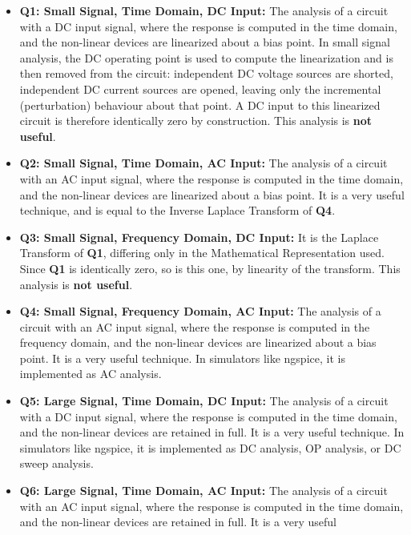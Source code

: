 \begin{itemize}
    \item \textbf{Q1: Small Signal, Time Domain, DC Input:}
      The analysis of a circuit with a DC input
      signal, where the response is computed in the time domain, and the
      non-linear devices are linearized about a bias point. In small
      signal analysis, the DC operating point is used to compute the
      linearization and is then removed from the circuit: independent DC
      voltage sources are shorted, independent DC current sources are
      opened, leaving only the incremental (perturbation) behaviour about
      that point. A DC input to this linearized circuit is therefore
      identically zero by construction. This analysis is \textbf{not useful}.
    \item \textbf{Q2: Small Signal, Time Domain, AC Input:}
      The analysis of a circuit with an AC input
      signal, where the response is computed in the time domain, and the
      non-linear devices are linearized about a bias point. It is a very
      useful technique, and is equal to the Inverse Laplace Transform of
      \textbf{Q4}.
    \item \textbf{Q3: Small Signal, Frequency Domain, DC Input:}
      It is the Laplace Transform of \textbf{Q1}, differing only in the Mathematical
      Representation used. Since \textbf{Q1} is identically zero, so is this one, by
      linearity of the transform. This analysis is \textbf{not useful}.
    \item \textbf{Q4: Small Signal, Frequency Domain, AC Input:}
      The analysis of a circuit with an AC
      input signal, where the response is computed in the frequency
      domain, and the non-linear devices are linearized about a bias
      point. It is a very useful technique. In simulators like ngspice, it
      is implemented as AC analysis.
    \item \textbf{Q5: Large Signal, Time Domain, DC Input:}
      The analysis of a circuit with a DC input
      signal, where the response is computed in the time domain, and the
      non-linear devices are retained in full. It is a very useful
      technique. In simulators like ngspice, it is implemented as DC
      analysis, OP analysis, or DC sweep analysis.
    \item \textbf{Q6: Large Signal, Time Domain, AC Input:}
      The analysis of a circuit with an AC input
      signal, where the response is computed in the time domain, and the
      non-linear devices are retained in full. It is a very useful

\end{itemize}
